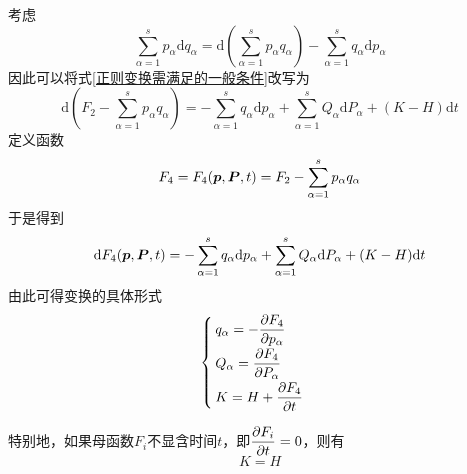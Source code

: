 考虑
\begin{equation*}
	\sum_{\alpha=1}^s p_\alpha \mathrm{d} q_\alpha = \mathrm{d} \left(\sum_{\alpha=1}^s p_\alpha q_\alpha\right) - \sum_{\alpha=1}^s q_\alpha \mathrm{d} p_\alpha
\end{equation*}
因此可以将式\eqref{正则变换需满足的一般条件}改写为
\begin{equation*}
	\mathrm{d} \left(F_2 - \sum_{\alpha=1}^s p_\alpha q_\alpha\right) = -\sum_{\alpha=1}^s q_\alpha \mathrm{d} p_\alpha + \sum_{\alpha=1}^s Q_\alpha \mathrm{d} P_\alpha + (K-H) \mathrm{d} t
\end{equation*}
定义函数
\begin{equation}
	F_4 = F_4(\boldsymbol{p},\boldsymbol{P},t) = F_2 - \sum_{\alpha=1}^s p_\alpha q_\alpha
	\label{第四类母函数}
\end{equation}
于是得到
\begin{equation}
	\mathrm{d} F_4(\boldsymbol{p},\boldsymbol{P},t) = -\sum_{\alpha=1}^s q_\alpha \mathrm{d} p_\alpha + \sum_{\alpha=1}^s Q_\alpha \mathrm{d} P_\alpha + (K-H) \mathrm{d} t
	\label{第四类母函数下的正则变换}
\end{equation}
由此可得变换的具体形式
\begin{equation}
	\begin{cases}
		\displaystyle q_\alpha = -\frac{\partial F_4}{\partial p_\alpha} \\[1.5ex]
		\displaystyle Q_\alpha = \frac{\partial F_4}{\partial P_\alpha} \\[1.5ex]
		\displaystyle K = H + \frac{\partial F_4}{\partial t}
	\end{cases}
\end{equation}

特别地，如果母函数$F_i$不显含时间$t$，即$\dfrac{\partial F_i}{\partial t} = 0$，则有
\begin{equation*}
	K=H
\end{equation*}

